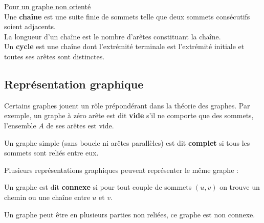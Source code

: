 \begin{defi}
\underline{Pour un graphe non orienté}\\
Une \textbf{chaîne} est une suite finie de sommets telle que deux sommets consécutifs soient adjacents.\\
La longueur d'un chaîne est le nombre d'arêtes constituant la chaîne.\\
Un \textbf{cycle} est une chaîne dont l'extrémité terminale est l'extrémité initiale et toutes ses arêtes sont distinctes.
\end{defi}


\subsection{Représentation graphique}

Certains graphes jouent un rôle prépondérant dans la théorie des graphes. Par exemple,
un graphe à zéro arête est dit \textbf{vide} s'il ne comporte que des sommets, l'ensemble $A$ de ses arêtes est vide.

Un graphe simple (sans boucle ni arêtes parallèles) est dit \textbf{complet} si tous les sommets sont reliés entre eux.

Plusieurs représentations graphiques peuvent représenter le même graphe :

\begin{center}
\end{center}

\begin{defi}
Un graphe est dit \textbf{connexe} si pour tout couple de sommets $(u, v)$ on trouve un chemin ou une chaîne entre $u$ et $v$.
\end{defi}

Un graphe peut être en plusieurs parties non reliées, ce graphe est non connexe.

